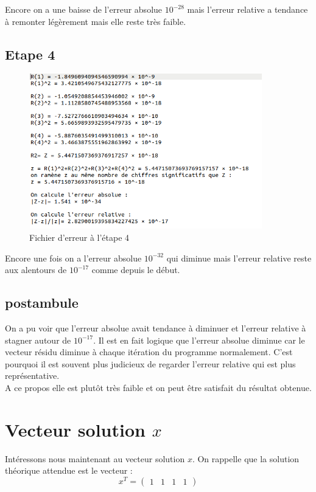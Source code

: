 \documentclass[12,french]{report}
\begin{document}
Encore on a une baisse de l'erreur absolue $10^{-28}$ mais l'erreur relative a tendance à remonter légèrement mais elle reste très faible.

\section{Etape 4}

\begin{figure}[H]
	\center
	\includegraphics[width=0.9\textwidth]{./Images/r_4_err}
	\caption{Fichier d'erreur à l'étape 4}
\end{figure}

Encore une fois on a l'erreur absolue $10^{-32}$ qui diminue mais l'erreur relative reste aux alentours de $10^{-17}$ comme depuis le début.

\section{postambule}

On a pu voir que l'erreur absolue avait tendance à diminuer et l'erreur relative à stagner autour de $10^{-17}$. Il est en fait logique que l'erreur absolue diminue car le vecteur résidu diminue à chaque itération du programme normalement. C'est pourquoi il est souvent plus judicieux de regarder l'erreur relative qui est plus représentative.\\
A ce propos elle est plutôt très faible et on peut être satisfait du résultat obtenue.

\chapter{Vecteur solution $x$} %

Intéressons nous maintenant au vecteur solution $x$. On rappelle que la solution théorique attendue est le vecteur :
$$x^T=\left(\begin{array}{cccc}
1 & 1 & 1 & 1\end{array}\right)$$
\end{document}
